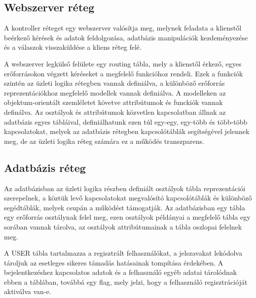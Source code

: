 \subsection{Webszerver réteg}\label{sect:szerver_reteg}

A kontroller réteget egy webszerver valósítja meg, melynek feladata a klienstől beérkező kérések és adatok feldolgozása, adatbázis manipulációk kezdeményezése és a válaszok visszaküldése a kliens réteg felé.

A webszerver legkülső felülete egy routing tábla, mely a klienstől érkező, egyes erőforrásokon végzett kéréseket a megfelelő funkcióhoz rendeli. Ezek a funkciók szintén az üzleti logika rétegben vannak definiálva, a különböző erőforrás reprezentációkhoz megfelelő modellek vannak definiálva. A modelleken az objektum-orientált szemléletet követve attribútumok és funckiók vannak definálva. Az osztályok és attribútumok közvetlen kapcsolatban állnak az adatbázis egyes tábláival, definiálhatunk ezen túl egy-egy, egy-több és több-több kapcsolatokat, melyek az adatbázis rétegben kapcsolótáblák segítségével jelennek meg, de az üzleti logika réteg számára ez a működés transzparens.

\subsection{Adatbázis réteg}\label{sect:adatbazis_reteg}

Az adatbázisban az üzleti logika részben definiált osztályok tábla reprezentációi szerepelnek, a köztük levő kapcsolatokat megvalósító kapcsolótáblák és különböző segédtáblák, melyek csupán a működést támogatják. Az adatbázisban egy tábla egy erőforrás osztálynak felel meg, ezen osztályok példányai a megfelelő tábla egy sorában vannak tárolva, az osztályok attribútumainak a tábla oszlopai felelnek meg.

A USER tábla tartalmazza a regisztrált felhasználókat, a jelszavakat lekódolva tároljuk az esetleges sikeres támadás hatásainak tompítása érdekében. A bejelentkezéshez kapcsolatos adatok és a felhasználó egyéb adatai tárolódnak ebben a táblában, továbbá egy flag, mely jelzi, hogy a felhasználó regisztrációját aktiválva van-e.

